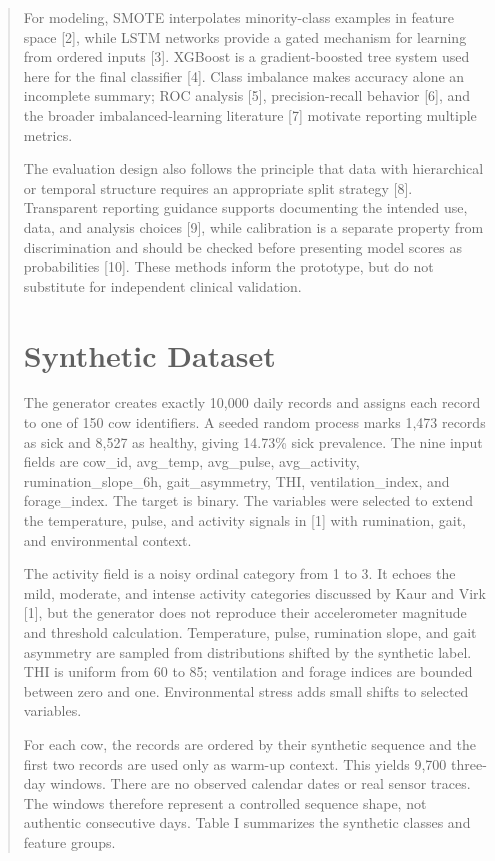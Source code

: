 \documentclass[journal]{IEEEtran}
\begin{document}
\begin{abstract}
For modeling, SMOTE interpolates minority-class examples in feature space [2], while LSTM networks provide a gated mechanism for learning from ordered inputs [3]. XGBoost is a gradient-boosted tree system used here for the final classifier [4]. Class imbalance makes accuracy alone an incomplete summary; ROC analysis [5], precision-recall behavior [6], and the broader imbalanced-learning literature [7] motivate reporting multiple metrics.

The evaluation design also follows the principle that data with hierarchical or temporal structure requires an appropriate split strategy [8]. Transparent reporting guidance supports documenting the intended use, data, and analysis choices [9], while calibration is a separate property from discrimination and should be checked before presenting model scores as probabilities [10]. These methods inform the prototype, but do not substitute for independent clinical validation.

\section{Synthetic Dataset}

The generator creates exactly 10,000 daily records and assigns each record to one of 150 cow identifiers. A seeded random process marks 1,473 records as sick and 8,527 as healthy, giving 14.73\% sick prevalence. The nine input fields are cow\_id, avg\_temp, avg\_pulse, avg\_activity, rumination\_slope\_6h, gait\_asymmetry, THI, ventilation\_index, and forage\_index. The target is binary. The variables were selected to extend the temperature, pulse, and activity signals in [1] with rumination, gait, and environmental context.

The activity field is a noisy ordinal category from 1 to 3. It echoes the mild, moderate, and intense activity categories discussed by Kaur and Virk [1], but the generator does not reproduce their accelerometer magnitude and threshold calculation. Temperature, pulse, rumination slope, and gait asymmetry are sampled from distributions shifted by the synthetic label. THI is uniform from 60 to 85; ventilation and forage indices are bounded between zero and one. Environmental stress adds small shifts to selected variables.

For each cow, the records are ordered by their synthetic sequence and the first two records are used only as warm-up context. This yields 9,700 three-day windows. There are no observed calendar dates or real sensor traces. The windows therefore represent a controlled sequence shape, not authentic consecutive days. Table I summarizes the synthetic classes and feature groups.


\end{abstract}
\end{document}
